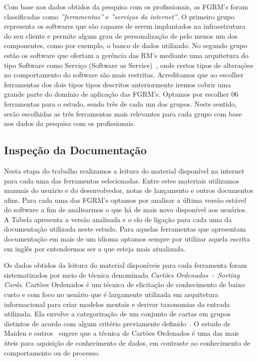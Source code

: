 Com base nos dados obtidos da pesquisa com os profissionais, as FGRM's foram
classificadas como \textit{''ferramentas''} e \textit{''serviços da internet''}.
O primeiro grupo representa os softwares que são capazes de serem implantados na
infraestrutura do seu cliente e permite algum grau de personalização de pelo
menos um dos componentes, como por exemplo, o banco de dados utilizado. No
segundo grupo estão os software que ofertam a gerência das RM's mediante uma
arquitetura do tipo Software como Serviço (Software as
Service)~\cite{fox2013engineering}, onde certos tipos de alterações no
comportamento do software são mais restritas. Acreditamos que ao escolher
ferramentas dos dois tipos tipos descritos anteriormente iremos cobrir uma
grande parte do domínio de aplicação das FGRM's. Optamos por escolher 06
ferramentas para o estudo, sendo três de cada um dos grupos. Neste sentido,
serão escolhidas as três ferramentas mais relevantes para cada grupo com base
nos dados da pesquisa com os profissionais.

\subsection{Inspeção da Documentação}
\label{subsec:inspecao_doumentacao}

Nesta etapa do trabalho realizamos a leitura do material disponível na internet
para cada uma das ferramentas selecionadas. Entre estes materiais utilizamos
manuais do usuário e do desenvolvedor, notas de lançamento e outros documentos
afins. Para cada uma das FGRM's optamos por analisar a última versão estável do
software a fim de analisarmos o que há de mais novo disponível aos usuários. A
Tabela apresenta a versão analisada e o elo de ligação para cada uma da
documentação utilizada neste estudo. Para aquelas ferramentas que apresentam
documentação em mais de um idioma optamos sempre por utilizar aquela escrita em
inglês por entendermos ser a que esteja mais atualizada.


Os dados obtidos da leitura do material disponíveis para cada ferramenta foram
sistematizados por meio de técnica denominada \textit{Cartões
	Ordenados~-~Sorting Cards}. Cartões Ordenados é um técnica de elicitação de
conhecimento de baixo custo e com foco no usuário que é largamente utilizada em
arquitetura informacional para criar modelos mentais e derivar taxonomias da
entrada utilizada. Ela envolve a categorização de um conjunto de cartas em
grupos distintos de acordo com algum critério previamente
definido~\cite{just2008towards,mcgee2009software}. O estudo de Maiden e
outros~\cite{maiden1996acre} sugere que a técnica de Cartões Ordenados é uma das
mais úteis para aquisição de conhecimento de dados, em contraste ao conhecimento
de comportamento ou de processo.

